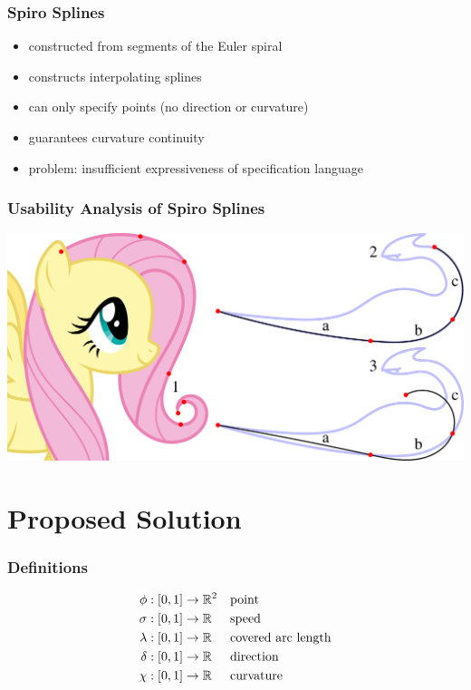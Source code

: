 \documentclass[mathserif]{beamer}
\begin{document}
		\begin{frame}
			\frametitle{Spiro Splines}
			\begin{itemize}
				\item constructed from segments of the Euler spiral
				\item constructs interpolating splines
				\item can only specify points (no direction or curvature)
				\item guarantees curvature continuity
				\item problem: insufficient expressiveness of specification language
			\end{itemize}
		\end{frame}
		
		\begin{frame}
			\frametitle{Usability Analysis of Spiro Splines}
			\begin{centering}
				\includegraphics[width=\textwidth]{../resources/usability_spiro.pdf}
			\end{centering}
		\end{frame}
	
	\section{Proposed Solution}
	
		\begin{frame}
			\frametitle{Definitions}
			\begin{align*}
				\phi    & : \left[ 0,1 \right] \rightarrow \mathbb{R}^{2} && \text{point}\\
				\sigma  & : \left[ 0,1 \right] \rightarrow \mathbb{R}   && \text{speed}\\
				\lambda & : \left[ 0,1 \right] \rightarrow \mathbb{R}   && \text{covered arc length}\\
				\delta  & : \left[ 0,1 \right] \rightarrow \mathbb{R}   && \text{direction}\\
				\chi    & : \left[ 0,1 \right] \rightarrow \mathbb{R}   && \text{curvature}
			\end{align*}
		\end{frame}
		
\end{document}
